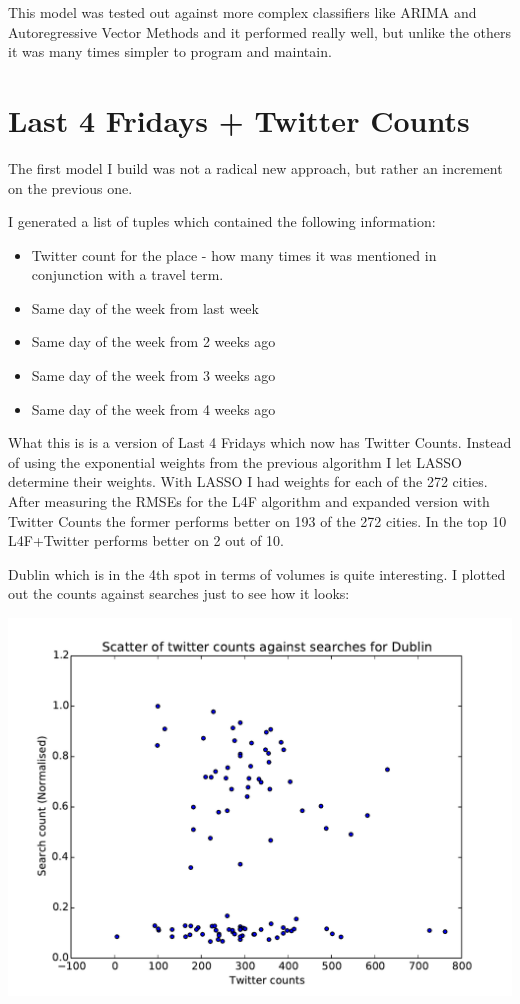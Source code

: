 \documentclass[minf,frontabs,twoside,singlespacing,parskip]{infthesis}
\begin{document}
This model was tested out against more complex classifiers like ARIMA and Autoregressive Vector Methods and it performed really well, but unlike the others it was many times simpler to program and maintain.

\section{Last 4 Fridays + Twitter Counts}

The first model I build was not a radical new approach, but rather an increment on the previous one.

I generated a list of tuples which contained the following information:
\begin{itemize}
\item Twitter count for the place - how many times it was mentioned in conjunction with a travel term.
\item Same day of the week from last week
\item Same day of the week from 2 weeks ago
\item Same day of the week from 3 weeks ago
\item Same day of the week from 4 weeks ago
\end{itemize}

What this is is a version of Last 4 Fridays which now has Twitter Counts. Instead of using the exponential weights from the previous algorithm I let LASSO determine their weights.
With LASSO I had weights for each of the 272 cities. After measuring the RMSEs for the L4F algorithm and expanded version with Twitter Counts the former performs better on 193 of the 272 cities. In the top 10 L4F+Twitter performs better on 2 out of 10. 

Dublin which is in the 4th spot in terms of volumes is quite interesting. I plotted out the counts against searches just to see how it looks:

\includegraphics[width=\textwidth]{Dublin}  
\end{document}
